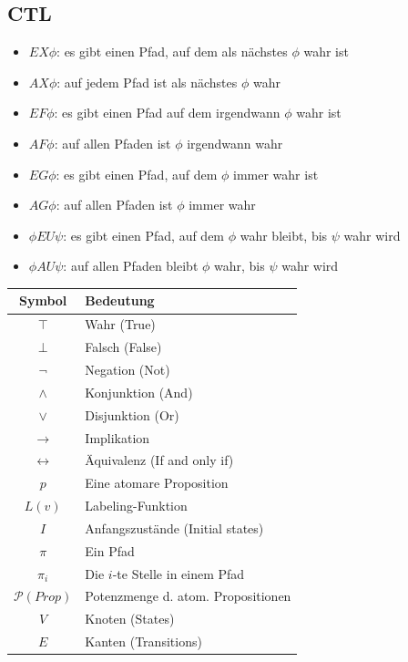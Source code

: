\documentclass[a4paper,6pt]{article}
\begin{document}
\begin{multicols*}{3}
\section{CTL}

\begin{itemize}
    \item $E X \phi$: es gibt einen Pfad, auf dem als nächstes $\phi$ wahr ist
    \item $A X \phi$: auf jedem Pfad ist als nächstes $\phi$ wahr
    \item $E F \phi$: es gibt einen Pfad auf dem irgendwann $\phi$ wahr ist
    \item $A F \phi$: auf allen Pfaden ist $\phi$ irgendwann wahr
    \item $E G \phi$: es gibt einen Pfad, auf dem $\phi$ immer wahr ist
    \item $A G \phi$: auf allen Pfaden ist $\phi$ immer wahr
    \item $\phi E U \psi$: es gibt einen Pfad, auf dem $\phi$ wahr bleibt, bis $\psi$ wahr wird
    \item $\phi A U \psi$: auf allen Pfaden bleibt $\phi$ wahr, bis $\psi$ wahr wird
\end{itemize}

\begin{center}
    \begin{tabular}{c|l}
    \textbf{Symbol} & \textbf{Bedeutung} \\
    \hline
    \( \top \) & Wahr (True) \\
    \( \bot \) & Falsch (False) \\
    \( \neg \) & Negation (Not) \\
    \( \wedge \) & Konjunktion (And) \\
    \( \vee \) & Disjunktion (Or) \\
    \( \rightarrow \) & Implikation \\
    \( \leftrightarrow \) & Äquivalenz (If and only if) \\
    \( p \) & Eine atomare Proposition \\
    \( L(v) \) & Labeling-Funktion \\
    \( I \) & Anfangszustände (Initial states) \\
    \( \pi \) & Ein Pfad \\
    \( \pi_i \) & Die \(i\)-te Stelle in einem Pfad \\
    \( \mathcal{P}(\mathit{Prop}) \) & Potenzmenge d. atom. Propositionen \\
    \( V \) & Knoten (States) \\
    \( E \) & Kanten (Transitions) \\
    \end{tabular}
\end{center}


\end{multicols*}
\end{document}
